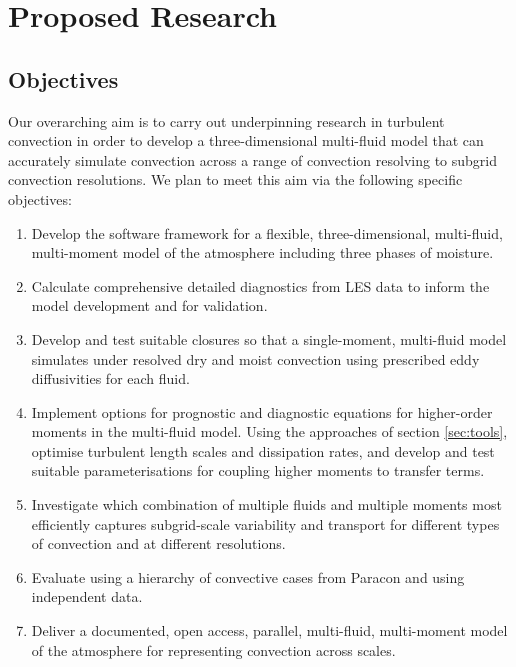\documentclass[11pt,a4paper]{article}
\begin{document}
\section{Proposed Research}

\subsection{Objectives}

Our overarching aim is to carry out underpinning research in turbulent convection in order to develop a three-dimensional multi-fluid model that can accurately simulate convection across a range of convection resolving to subgrid convection resolutions.
We plan to meet this aim via the following specific objectives:

\begin{enumerate}
\item\label{it:model} Develop the software framework for a flexible, three-dimensional, multi-fluid, multi-moment model of the atmosphere including three phases of moisture. %

\item\label{it:budgets} Calculate comprehensive detailed diagnostics from LES data to inform the model development and for validation.

\item Develop and test suitable closures so that a single-moment, multi-fluid model simulates under resolved dry and moist convection using prescribed eddy diffusivities for each fluid.

\item Implement options for prognostic and diagnostic equations for higher-order moments in the multi-fluid model. Using the approaches of section \ref{sec:tools}, optimise turbulent length scales and dissipation rates, and develop and test suitable parameterisations for coupling higher moments to transfer terms.

\item Investigate which combination of multiple fluids and multiple moments most efficiently captures subgrid-scale
variability and transport for different types of convection and at different resolutions.

\item Evaluate using a hierarchy of convective cases from Paracon and using independent data.

\item Deliver a documented, open access, parallel, multi-fluid, multi-moment model of the atmosphere for representing convection across scales.
\end{enumerate}
\end{document}
